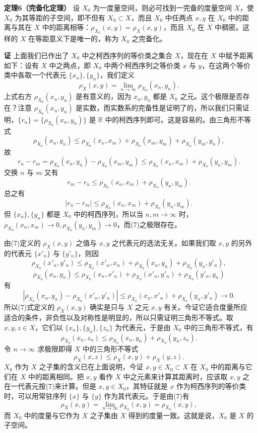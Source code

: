 \noindent\textbf{定理6（完备化定理）}\quad
设 $X_0$ 为一度量空间，则必可找到一完备的度量空间 $X$，使 $X_0$ 为其等距的子空间，即不但有 $X_0\subset X$，而且 $X_0$ 中任两点 $x,y$ 在 $X_0$ 中的距离与其在 $X$ 中的距离相等：$\rho_{X_0}(x,y)=\rho_X(x,y)$，而且 $X_0$ 在 $X$ 中稠密。这样的 $X$ 在等距意义下是唯一的，称为 $X_0$ 之完备化。

\noindent\textbf{证}\quad
上面我们已作出了 $X_0$ 中之柯西序列的等价类之集合 $X$，现在在 $X$ 中赋予距离如下：设有 $X$ 中之两点，即 $X_0$ 中两个柯西序列之等价类 $x$ 与 $y$，在这两个等价类中各取一个代表元 $\{x_n\},\{y_n\}$，我们定义
\begin{equation}
 \rho_X(x,y)=\lim_{n\to\infty}\rho_{X_0}(x_n,y_n).
 \tag{7}
\end{equation}
上式右方 $\rho_{X_0}(x_n,y_n)$ 是有意义的，因为 $x_n,y_n$ 都是 $X_0$ 之元。这个极限是否存在？注意 $\rho_{X_0}(x_n,y_n)$ 是实数，而实数系的完备性是证明了的，所以我们只需证明，$\{r_n\}=\{\rho_{X_0}(x_n,y_n)\}$ 是 $\mathbb R$ 中的柯西序列即可。这是容易的。由三角形不等式
\[
 \rho_{X_0}(x_n,y_n)\le \rho_{X_0}(x_n,x_m)+\rho_{X_0}(x_m,y_m)+\rho_{X_0}(y_m,y_n),
\]
故
\[
 r_n-r_m=\rho_{X_0}(x_n,y_n)-\rho_{X_0}(x_m,y_m)
 \le\rho_{X_0}(x_n,x_m)+\rho_{X_0}(y_n,y_m).
\]
交换 $n$ 与 $m$ 又有
\[
 r_m-r_n\le\rho_{X_0}(x_n,x_m)+\rho_{X_0}(y_n,y_m).
\]
总之有
\[
 |r_n-r_m|\le\rho_{X_0}(x_n,x_m)+\rho_{X_0}(y_n,y_m).
\]
但 $\{x_n\},\{y_n\}$ 都是 $X_0$ 中的柯西序列，所以当 $n,m\to\infty$ 时，$\rho_{X_0}(x_n,x_m)\to0,\rho_{X_0}(y_n,y_m)\to0$，而(7)之极限存在。

由(7)定义的 $\rho_X(x,y)$ 之值与 $x,y$ 之代表元的选法无关。如果我们取 $x,y$ 的另外的代表元 $\{x'_n\}$ 与 $\{y'_n\}$，则因
\[
 \rho_{X_0}(x'_n,y'_n)\le\rho_{X_0}(x'_n,x_n)+\rho_{X_0}(x_n,y_n)+\rho_{X_0}(y_n,y'_n),
\]
\[
 \rho_{X_0}(x_n,y_n)\le\rho_{X_0}(x_n,x'_n)+\rho_{X_0}(x'_n,y'_n)+\rho_{X_0}(y'_n,y_n)
\]
有
\[
 |\rho_{X_0}(x_n,y_n)-\rho_{X_0}(x'_n,y'_n)|
 \le\rho_{X_0}(x_n,x'_n)+\rho_{X_0}(y_n,y'_n)\to0.
\]
所以(7)式定义的 $\rho_X(x,y)$ 确实是只与 $X$ 之元 $x,y$ 有关。今证它适合度量所应适合的条件，非负性以及对称性是明显的，所以只需证明三角形不等式。取 $x,y,z\in X$，它们以 $\{x_n\},\{y_n\},\{z_n\}$ 为代表元，于是由 $X_0$ 中的三角形不等式，有
\[
 \rho_{X_0}(x_n,z_n)\le\rho_{X_0}(x_n,y_n)+\rho_{X_0}(y_n,z_n).
\]
令 $n\to\infty$ 求极限即得 $X$ 中的三角形不等式
\[
 \rho_X(x,z)\le\rho_X(x,y)+\rho_X(y,z).
\]
$X_0$ 作为 $X$ 之子集的含义已在上面说明，今证 $x,y\in X_0\subset X$ 在 $X_0$ 中的距离与它们在 $X$ 中的距离相同。把 $x,y$ 看作 $X$ 中之元素来计算其距离时，应该取 $x,y$ 之在一代表元按(7)来计算。但是 $x,y\in X_0$，其特征就是 $x$ 作为柯西序列的等价类时，可以用常驻序列 $\{x\}$ 与 $\{y\}$ 作为其代表元。于是由(7)有
\[
 \rho_X(x,y)=\lim_{n\to\infty}\rho_{X_0}(x,y)=\rho_{X_0}(x,y),
\]
而 $X_0$ 中的度量与它作为 $X$ 之子集由 $X$ 得到的度量一致。这就是说，$X_0$ 是 $X$ 的子空间。


